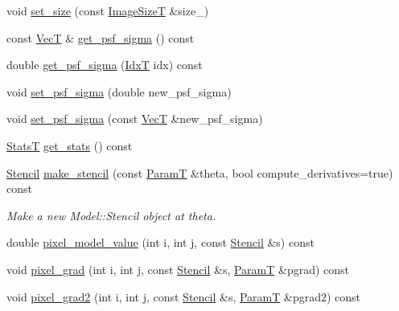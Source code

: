 \begin{DoxyCompactItemize}
\item 
void \hyperlink{classmappel_1_1Gauss2DModel_a8d92d03d6801a59de097d599c798dc79}{set\+\_\+size} (const \hyperlink{classmappel_1_1ImageFormat2DBase_a49cccf61eb2a768a202634d27fcd81d5}{Image\+SizeT} \&size\+\_\+)
\item 
const \hyperlink{namespacemappel_a2225ad69f358daa3f4f99282a35b9a3a}{VecT} \& \hyperlink{classmappel_1_1Gauss2DModel_a8c486209390a402c96e6816b794cd0e6}{get\+\_\+psf\+\_\+sigma} () const 
\item 
double \hyperlink{classmappel_1_1Gauss2DModel_a723817b4af0498e9e1fe0baeed865132}{get\+\_\+psf\+\_\+sigma} (\hyperlink{namespacemappel_ab17ec0f30b61ece292439d7ece81d3a8}{IdxT} idx) const 
\item 
void \hyperlink{classmappel_1_1Gauss2DModel_ae089ec4fb64b04d2bbefe6506f1f8085}{set\+\_\+psf\+\_\+sigma} (double new\+\_\+psf\+\_\+sigma)
\item 
void \hyperlink{classmappel_1_1Gauss2DModel_abe39c2b7eb4eaaca9e67cdf6cfe441dc}{set\+\_\+psf\+\_\+sigma} (const \hyperlink{namespacemappel_a2225ad69f358daa3f4f99282a35b9a3a}{VecT} \&new\+\_\+psf\+\_\+sigma)
\item 
\hyperlink{namespacemappel_a04ab395b0cf82c4ce68a36b2212649a5}{StatsT} \hyperlink{classmappel_1_1Gauss2DModel_a8aecb8960e94b03499110e08f5d18c7f}{get\+\_\+stats} () const 
\item 
\hyperlink{classmappel_1_1Gauss2DModel_1_1Stencil}{Stencil} \hyperlink{classmappel_1_1Gauss2DModel_a584652e2d4ac0b27e870a21150c035a2}{make\+\_\+stencil} (const \hyperlink{classmappel_1_1PointEmitterModel_a665ec6aea3aac139bb69a23c06d4b9a1}{ParamT} \&theta, bool compute\+\_\+derivatives=true) const 
\begin{DoxyCompactList}\small\item\em Make a new Model\+::\+Stencil object at theta. \end{DoxyCompactList}\item 
double \hyperlink{classmappel_1_1Gauss2DModel_a13cf02af379a7b2f7060008a9a7dfc82}{pixel\+\_\+model\+\_\+value} (int i, int j, const \hyperlink{classmappel_1_1Gauss2DModel_1_1Stencil}{Stencil} \&s) const 
\item 
void \hyperlink{classmappel_1_1Gauss2DModel_ae1c726836b5e437721a73183fbf349d7}{pixel\+\_\+grad} (int i, int j, const \hyperlink{classmappel_1_1Gauss2DModel_1_1Stencil}{Stencil} \&s, \hyperlink{classmappel_1_1PointEmitterModel_a665ec6aea3aac139bb69a23c06d4b9a1}{ParamT} \&pgrad) const 
\item 
void \hyperlink{classmappel_1_1Gauss2DModel_a608d40cbec10a7dcfd82913c619748ae}{pixel\+\_\+grad2} (int i, int j, const \hyperlink{classmappel_1_1Gauss2DModel_1_1Stencil}{Stencil} \&s, \hyperlink{classmappel_1_1PointEmitterModel_a665ec6aea3aac139bb69a23c06d4b9a1}{ParamT} \&pgrad2) const 

\end{DoxyCompactItemize}
